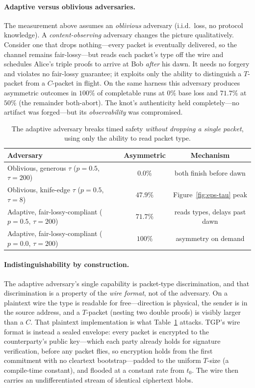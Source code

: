 \paragraph{Adaptive versus oblivious adversaries.}

The measurement above assumes an \emph{oblivious} adversary (i.i.d.\ loss, no protocol knowledge). A \emph{content-observing} adversary changes the picture qualitatively. Consider one that drops nothing---every packet is eventually delivered, so the channel remains fair-lossy---but reads each packet's type off the wire and schedules Alice's triple proofs to arrive at Bob \emph{after} his dawn. It needs no forgery and violates no fair-lossy guarantee; it exploits only the ability to distinguish a $T$-packet from a $C$-packet in flight. On the same harness this adversary produces asymmetric outcomes in $100\%$ of completable runs at $0\%$ base loss and $71.7\%$ at $50\%$ (the remainder both-abort). The knot's authenticity held completely---no artifact was forged---but its \emph{observability} was compromised.

\begin{table}[h]
\centering
\begin{tabular}{lcc}
\toprule
\textbf{Adversary} & \textbf{Asymmetric} & \textbf{Mechanism} \\
\midrule
Oblivious, generous $\tau$ ($p{=}0.5$, $\tau{=}200$) & $0.0\%$ & both finish before dawn \\
Oblivious, knife-edge $\tau$ ($p{=}0.5$, $\tau{=}8$) & $47.9\%$ & Figure~\ref{fig:eps-tau} peak \\
Adaptive, fair-lossy-compliant ($p{=}0.5$, $\tau{=}200$) & $71.7\%$ & reads types, delays past dawn \\
Adaptive, fair-lossy-compliant ($p{=}0.0$, $\tau{=}200$) & $100\%$ & asymmetry on demand \\
\bottomrule
\end{tabular}
\caption{The adaptive adversary breaks timed safety \emph{without dropping a single packet}, using only the ability to read packet type.}
\label{tab:adaptive}
\end{table}

\paragraph{Indistinguishability by construction.}

The adaptive adversary's single capability is packet-type discrimination, and that discrimination is a property of the \emph{wire format}, not of the adversary. On a plaintext wire the type is readable for free---direction is physical, the sender is in the source address, and a $T$-packet (nesting two double proofs) is visibly larger than a $C$. That plaintext implementation is what Table~\ref{tab:adaptive} attacks. TGP's wire format is instead a sealed envelope: every packet is encrypted to the counterparty's public key---which each party already holds for signature verification, before any packet flies, so encryption holds from the first commitment with no cleartext bootstrap---padded to the uniform $T$-size (a compile-time constant), and flooded at a constant rate from $t_0$. The wire then carries an undifferentiated stream of identical ciphertext blobs.

